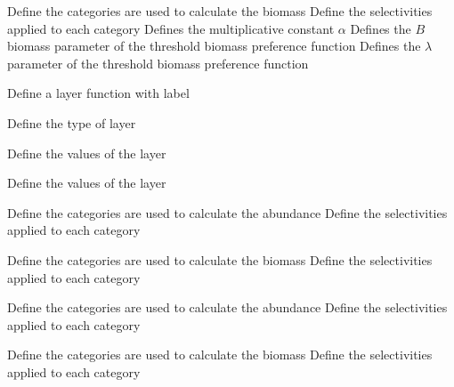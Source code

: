  {Define the categories are used to calculate the biomass}
 {Define the selectivities applied to each category}
 {Defines the multiplicative constant $\alpha$}
 {Defines the $B$ biomass parameter of the threshold biomass preference function}
 {Defines the $\lambda$ parameter of the threshold biomass preference function}
\par{} {Define a layer function with label}\par
{} {Define the type of layer}
\par\textbf{}\par
{} {Define the values of the layer}
\par\textbf{}\par
{} {Define the values of the layer}
\par\textbf{}\par
\par\textbf{}\par
{} {Define the categories are used to calculate the abundance}
 {Define the selectivities applied to each category}
\par\textbf{}\par
{} {Define the categories are used to calculate the biomass}
 {Define the selectivities applied to each category}
\par\textbf{}\par
{} {Define the categories are used to calculate the abundance}
 {Define the selectivities applied to each category}
\par\textbf{}\par
{} {Define the categories are used to calculate the biomass}
 {Define the selectivities applied to each category}

